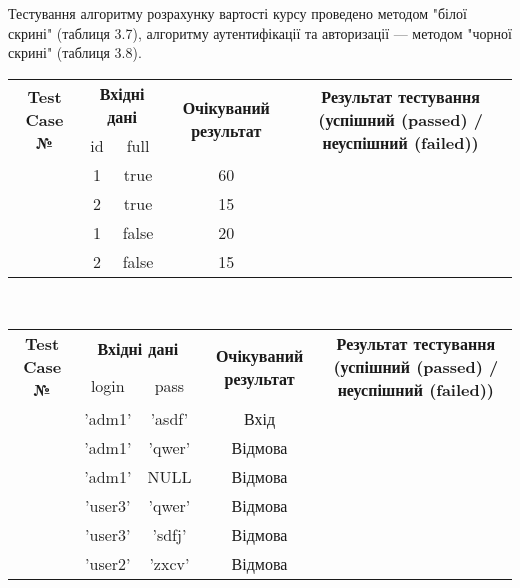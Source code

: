 Тестування алгоритму розрахунку вартості курсу проведено методом "білої скрині" (таблиця 3.7), алгоритму аутентифікації та авторизації --- методом "чорної скрині" (таблиця 3.8).
\def\tcn{\addtocounter{tcnt}{1} \thetcnt}
\begin{tabular}{|c|c|c|c|c|}
\hline
\multirow{2}{23mm}{\centering \textbf{Test Case №}} &
\multicolumn{2}{c|}{\textbf{Вхідні дані}} &
\multirow{2}{27mm}{\centering \textbf{Очікуваний результат}} &
\multirow{2}{77mm}{\centering \textbf{Результат тестування (успішний (passed) / неуспішний (failed))}} \tabularnewline
\cline{2-3}
&id&full&&\tabularnewline
\hline
\tcn& 1	& true	& 60	&	\\
\tcn& 2	& true	& 15	&	\\
\tcn& 1	& false	& 20	&	\\
\tcn& 2	& false	& 15	&	\\
\hline
\end{tabular}
\setcounter{tcnt}{0}
\\
\begin{tabular}{|c|c|c|c|c|}
\hline
\multirow{2}{18mm}{\centering \textbf{Test Case №}} &
\multicolumn{2}{c|}{\textbf{Вхідні дані}} &
\multirow{2}{27mm}{\centering \textbf{Очікуваний результат}} &
\multirow{2}{75mm}{\centering \textbf{Результат тестування (успішний (passed) / неуспішний (failed))}} \tabularnewline
\cline{2-3}
&login&pass&&\tabularnewline
\hline
\tcn& 'adm1'	& 'asdf'	& Вхід		&	\\
\tcn& 'adm1'	& 'qwer'	& Відмова	&	\\
\tcn& 'adm1'	& NULL		& Відмова	&	\\
\tcn& 'user3'	& 'qwer'	& Відмова	&	\\
\tcn& 'user3'	& 'sdfj'	& Відмова	&	\\
\tcn& 'user2'	& 'zxcv'	& Відмова	&	\\
\hline
\end{tabular}
